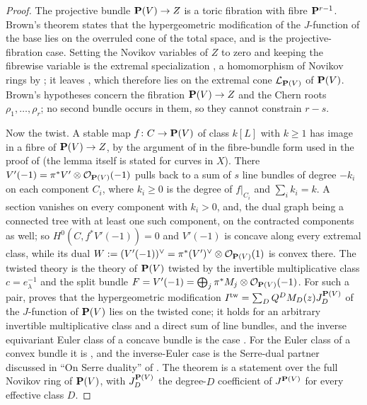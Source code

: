 \begin{proof}
  The projective bundle \(\mathbf P(V)\to Z\) is a toric fibration with fibre
  \(\mathbf P^{r-1}\).  Brown's theorem \cite[Theorem~1]{Brown} states that the
  hypergeometric modification of the \(J\)-function of the base lies on the
  overruled cone of the total space, and \cite[Corollary~1]{Brown} is the
  projective-fibration case.  Setting the Novikov variables of \(Z\) to zero
  and keeping the fibrewise variable is the extremal specialization
  \cite[(33)]{SS}, a homomorphism of Novikov rings by
  \cite[Proposition~4.1]{SS}; it leaves \cite[(34)]{SS}, which therefore
  lies on the extremal cone \(\mathcal L_{\mathbf P(V)}\) of \(\mathbf P(V)\).  Brown's
  hypotheses concern the fibration
  \(\mathbf P(V)\to Z\) and the Chern roots \(\rho_{1},\dots,\rho_{r}\); no second
  bundle occurs in them, so they cannot constrain \(r-s\).

  Now the twist.  A stable map \(f\colon C\to\mathbf P(V)\) of class \(k[L]\) with
  \(k\ge1\) has image in a fibre of \(\mathbf P(V)\to Z\), by the argument of
  \cite[Lemma~2.6]{SS} in the fibre-bundle form used in the proof of
  \cite[Theorem~4.2]{SS} (the lemma itself is stated for curves in \(X\)).
  There \(V'(-1)=\pi^{*}V'\otimes\mathcal O_{\mathbf P(V)}(-1)\) pulls back to a
  sum of \(s\) line bundles of degree \(-k_{i}\) on each component
  \(C_{i}\), where \(k_{i}\ge0\) is the degree of \(f|_{C_{i}}\) and
  \(\sum_{i}k_{i}=k\).  A section vanishes on every component with
  \(k_{i}>0\), and, the dual graph being a connected tree with at least one
  such component, on the contracted components as well; so
  \(H^{0}(C,f^{*}V'(-1))=0\) and
  \(V'(-1)\) is concave along every extremal class, while its dual
  \(W:=(V'(-1))^{\vee}=\pi^{*}(V')^{\vee}\otimes\mathcal O_{\mathbf P(V)}(1)\) is
  convex there.  The twisted theory is the theory of \(\mathbf P(V)\) twisted by the
  invertible multiplicative class \(c=e_{\lambda}^{-1}\) and the split bundle
  \(F=V'(-1)=\bigoplus_{j}\pi^{*}M_{j}\otimes\mathcal O_{\mathbf P(V)}(-1)\).  For
  such a pair, \cite[Theorem~4.6]{CCIT} proves that the hypergeometric
  modification \(I^{\mathrm{tw}}=\sum_{D}Q^{D}M_{D}(z)J^{\mathbf P(V)}_{D}\) of the
  \(J\)-function of \(\mathbf P(V)\) lies on the twisted cone; it holds for an
  arbitrary invertible multiplicative class and a direct sum of line bundles,
  and the inverse equivariant Euler class of a concave bundle is the case
  \cite[Example~A]{CCIT}.  For the Euler class of a convex bundle it is
  \cite[Theorem~2]{CoatesGivental}, and the inverse-Euler case is the
  Serre-dual partner discussed in ``On Serre duality'' of
  \cite{CoatesGivental}.  The theorem is a statement over the full Novikov
  ring of \(\mathbf P(V)\), with \(J^{\mathbf P(V)}_{D}\) the degree-\(D\) coefficient of
  \(J^{\mathbf P(V)}\) for every effective class \(D\).


\end{proof}
